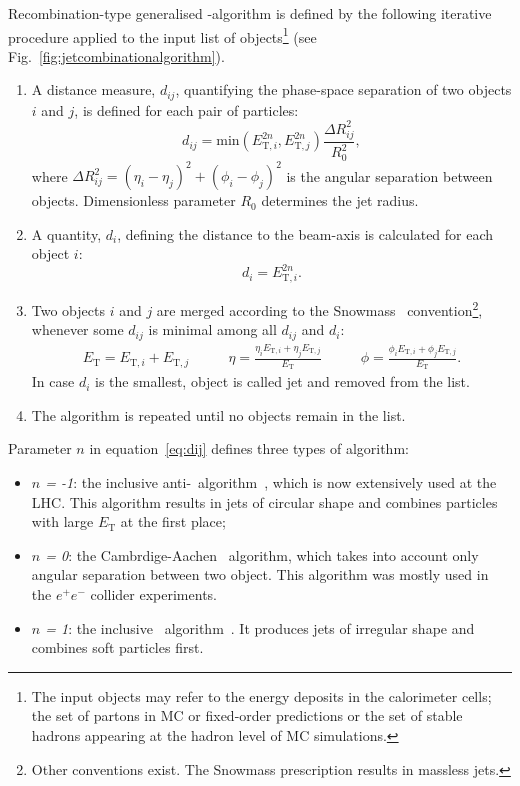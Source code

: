 Recombination-type generalised \kt-algorithm is defined by the following iterative procedure applied to the input list of objects\footnote{The input objects may refer to the energy deposits in the calorimeter cells; the set of partons in MC or fixed-order predictions or the set of stable hadrons appearing at the hadron level of MC simulations.} (see Fig.~\ref{fig:jetcombinationalgorithm}).
\begin{enumerate}
	\item A distance measure, $d_{ij}$, quantifying the phase-space separation of two objects $i$ and $j$, is defined for each pair of particles:
	\begin{equation}
	  d_{ij} = \mathrm{\text{min}} \left( E_{\text{T},i}^{2n}, E_{\text{T},j}^{2n} \right) \dfrac{\Delta R_{ij}^2}{R_0^2},
		\label{eq:dij}
	\end{equation}
	where $\Delta R_{ij}^2 = \left( \eta_{i} - \eta_{j} \right)^2 + \left( \phi_{i} - \phi_{j} \right)^2$ is the angular separation between objects. Dimensionless parameter $R_0$ determines the jet radius.
	\item A quantity, $d_i$, defining the distance to the beam-axis is calculated for each object $i$:
		\begin{equation}
	  d_{i} = E_{\text{T},i}^{2n}.
		\label{eq:di}
	\end{equation}
	\item Two objects $i$ and $j$ are merged according to the Snowmass~\cite{proc:snowmass:1990:134} convention\footnote{Other conventions exist. The Snowmass prescription results in massless jets.}, whenever some $d_{ij}$ is minimal among all $d_{ij}$ and $d_{i}$:
	\begin{align}
		E_\text{T} = E_{\text{T},i} + E_{\text{T},j} & \qquad \eta = \frac{\eta_iE_{\text{T},i} + \eta_jE_{\text{T},j}}{E_\text{T}} & \qquad \phi = \frac{\phi_iE_{\text{T},i} + \phi_jE_{\text{T},j}}{E_\text{T}}.			 \label{eq:snowmass}
	\end{align}
	In case $d_i$ is the smallest, object is called jet and removed from the list.
	\item The algorithm is repeated until no objects remain in the list.
\end{enumerate}
Parameter $n$ in equation~\ref{eq:dij} defines three types of algorithm:
\begin{itemize}
	\item \textsl{$n$ = -1}: the inclusive anti-\kt~algorithm~\cite{pub:antikt}, which is now extensively used at the LHC. This algorithm results in jets of circular shape and combines particles with large $E_\text{T}$ at the first place;
	\item \textsl{$n$ = 0}: the Cambrdige-Aachen~\cite{pub:cambidgeaachen} algorithm, which takes into account only angular separation between two object.  This algorithm was mostly used in the $e^+e^-$ collider experiments.
	\item \textsl{$n$ = 1}: the inclusive \kt~algorithm~\cite{pub:kt}. It produces jets of irregular shape and combines soft particles first.
\end{itemize}
